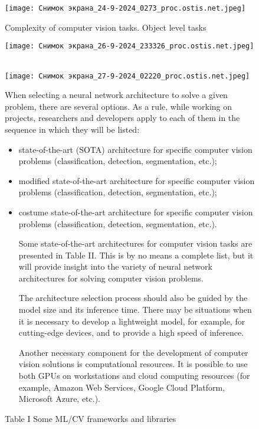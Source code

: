 \documentclass{article}
\begin{document}
\begin{figure}[h]
    
    \centering
    \texttt{[image: Снимок экрана\_24-9-2024\_0273\_proc.ostis.net.jpeg]}
    \caption {Complexity of computer vision tasks. Object level tasks}
    \caption {Table I
Some ML/CV frameworks and libraries}
    \texttt{[image: Снимок экрана\_26-9-2024\_233326\_proc.ostis.net.jpeg]}
    \
    \begin{multicols}{2} 
\texttt{[image: Снимок экрана\_27-9-2024\_02220\_proc.ostis.net.jpeg]}
\hspace{49mm}%
    \label{fig:enter-label} 
 
\setlength{\hsize}{0.9\hsize}%




 When selecting a neural network architecture to solve     
a given problem, there are several options. As a rule,
while working on projects, researchers and developers
apply to each of them in the sequence in which they will
be listed:
\begin{itemize}[noitemsep]
    \item 

 state-of-the-art (SOTA) architecture for specific
computer vision problems (classification, detection,
    segmentation, etc.);
    \columnbreak
    
\item modified state-of-the-art architecture for specific
computer vision problems (classification, detection,
segmentation, etc.);


\item costume state-of-the-art architecture for specific
computer vision problems (classification, detection,
segmentation, etc.).

 Some state-of-the-art architectures for computer vision
tasks are presented in Table II. This is by no means a
complete list, but it will provide insight into the variety of
neural network architectures for solving computer vision
problems.

The architecture selection process should also be
guided by the model size and its inference time. There
may be situations when it is necessary to develop a
lightweight model, for example, for cutting-edge devices,
and to provide a high speed of inference.

Another necessary component for the development of
computer vision solutions is computational resources.
It is possible to use both GPUs on workstations and
cloud computing resources (for example, Amazon Web
Services, Google Cloud Platform, Microsoft Azure, etc.).





\end{itemize}



\end{multicols}
\end{figure}
\end{document}
